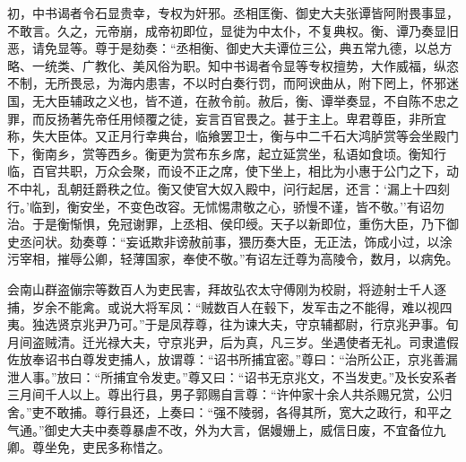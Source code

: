 \documentclass[]{article}
\begin{document}
初，中书谒者令石显贵幸，专权为奸邪。丞相匡衡、御史大夫张谭皆阿附畏事显，不敢言。久之，元帝崩，成帝初即位，显徙为中太仆，不复典权。衡、谭乃奏显旧恶，请免显等。尊于是劾奏：``丞相衡、御史大夫谭位三公，典五常九德，以总方略、一统类、广教化、美风俗为职。知中书谒者令显等专权擅势，大作威福，纵恣不制，无所畏忌，为海内患害，不以时白奏行罚，而阿谀曲从，附下罔上，怀邪迷国，无大臣辅政之义也，皆不道，在赦令前。赦后，衡、谭举奏显，不自陈不忠之罪，而反扬著先帝任用倾覆之徒，妄言百官畏之。甚于主上。卑君尊臣，非所宜称，失大臣体。又正月行幸典台，临飨罢卫士，衡与中二千石大鸿胪赏等会坐殿门下，衡南乡，赏等西乡。衡更为赏布东乡席，起立延赏坐，私语如食顷。衡知行临，百官共职，万众会聚，而设不正之席，使下坐上，相比为小惠于公门之下，动不中礼，乱朝廷爵秩之位。衡又使官大奴入殿中，问行起居，还言：`漏上十四刻行。'临到，衡安坐，不变色改容。无怵惕肃敬之心，骄慢不谨，皆不敬。''有诏勿治。于是衡惭惧，免冠谢罪，上丞相、侯印绶。天子以新即位，重伤大臣，乃下御史丞问状。劾奏尊：``妄诋欺非谤赦前事，猥历奏大臣，无正法，饰成小过，以涂污宰相，摧辱公卿，轻薄国家，奉使不敬。''有诏左迁尊为高陵令，数月，以病免。

会南山群盗傰宗等数百人为吏民害，拜故弘农太守傅刚为校尉，将迹射士千人逐捕，岁余不能禽。或说大将军凤：``贼数百人在毂下，发军击之不能得，难以视四夷。独选贤京兆尹乃可。''于是凤荐尊，往为谏大夫，守京辅都尉，行京兆尹事。旬月间盗贼清。迁光禄大夫，守京兆尹，后为真，凡三岁。坐遇使者无礼。司隶遣假佐放奉诏书白尊发吏捕人，放谓尊：``诏书所捕宜密。''尊曰：``治所公正，京兆善漏泄人事。''放曰：``所捕宜令发吏。''尊又曰：``诏书无京兆文，不当发吏。''及长安系者三月间千人以上。尊出行县，男子郭赐自言尊：``许仲家十余人共杀赐兄赏，公归舍。''吏不敢捕。尊行县还，上奏曰：``强不陵弱，各得其所，宽大之政行，和平之气通。''御史大夫中奏尊暴虐不改，外为大言，倨嫚姗上，威信日废，不宜备位九卿。尊坐免，吏民多称惜之。
\end{document}
